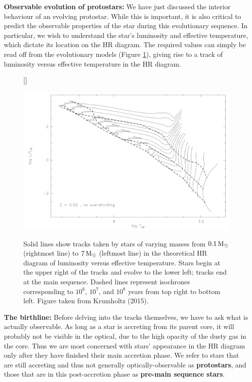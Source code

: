 \documentclass[a4paper,10pt]{article}
\begin{document}
{\noindent}\textbf{Observable evolution of protostars:} We have just discussed the interior behaviour of an evolving protostar. While this is important, it is also critical to predict the observable properties of the star during this evolutionary sequence. In particular, we wish to understand the star's luminosity and effective temperature, which dictate its location on the HR diagram. The required values can simply be read off from the evolutionary models (Figure \ref{fig:HRmodels}), giving rise to a track of luminosity versus effective temperature in the HR diagram.

\begin{figure}[t]
    [\FBwidth]
    {\caption{\footnotesize{Solid lines show tracks taken by stars of varying masses from $0.1\,{\rm M_\odot}$ (rightmost line) to $7\,{\rm M_\odot}$ (leftmost line) in the theoretical HR diagram of luminosity versus effective temperature. Stars begin at the upper right of the tracks and evolve to the lower left; tracks end at the main sequence. Dashed lines represent isochrones corresponding to $10^6$, $10^7$, and $10^8$ years from top right to bottom left. Figure taken from Krumholtz (2015).}}
    \label{fig:HRmodels}}
    {\includegraphics[width=12cm]{figures/HR_models.png}}
\end{figure}

{\noindent}\textbf{The birthline:} Before delving into the tracks themselves, we have to ask what is actually observable. As long as a star is accreting from its parent core, it will probably not be visible in the optical, due to the high opacity of the dusty gas in the core. Thus we are most concerned with stars' appearance in the HR diagram only after they have finished their main accretion phase. We refer to stars that are still accreting and thus not generally optically-observable as \textbf{protostars}, and those that are in this post-accretion phase as \textbf{pre-main sequence stars}.
\end{document}
